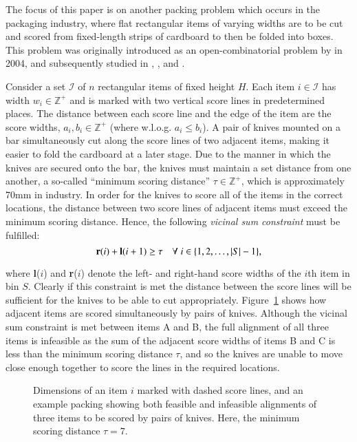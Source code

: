 \documentclass[authoryear]{elsarticle}
\begin{document}
The focus of this paper is on another packing problem which occurs in the packaging industry, where flat rectangular items of varying widths are to be cut and scored from fixed-length strips of cardboard to then be folded into boxes. This problem was originally introduced as an open-combinatorial problem by \citeauthor{goulimis2004} in 2004, and subsequently studied in \citet{lewis2011}, \citet{becker2015}, and \citet{hawa2018}.

Consider a set $\mathcal{I}$ of $n$ rectangular items of fixed height $H$. Each item $i \in \mathcal{I}$ has width $w_i \in \mathbb{Z}^+$ and is marked with two vertical score lines in predetermined places. The distance between each score line and the edge of the item are the score widths, $a_i, b_i \in \mathbb{Z}^+$ (where w.l.o.g. $a_i \leq b_i$). A pair of knives mounted on a bar simultaneously cut along the score lines of two adjacent items, making it easier to fold the cardboard at a later stage. Due to the manner in which the knives are secured onto the bar, the knives must maintain a set distance from one another, a so-called ``minimum scoring distance'' $\tau \in \mathbb{Z}^+$, which is approximately 70mm in industry. In order for the knives to score all of the items in the correct locations, the distance between two score lines of adjacent items must exceed the minimum scoring distance. Hence, the following \emph{vicinal sum constraint} must be fulfilled:
\begin{equation}
	\textbf{r}(i) + \textbf{l}(i+1) \geq \tau \quad \forall \hspace{1mm} i \in \{1,2,\dotsc,|S|- 1\},
	\label{eqn:vsc}
\end{equation}

\noindent where \textbf{l}($i$) and \textbf{r}($i$) denote the left- and right-hand score widths of the $i$th item in bin $S$. Clearly if this constraint is met the distance between the score lines will be sufficient for the knives to be able to cut appropriately. Figure~\ref{fig:itemsknife} shows how adjacent items are scored simultaneously by pairs of knives. Although the vicinal sum constraint is met between items A and B, the full alignment of all three items is infeasible as the sum of the adjacent score widths of items B and C is less than the minimum scoring distance $\tau$, and so the knives are unable to move close enough together to score the lines in the required locations.
\begin{figure}[H]	
	\centering
	
	\caption{Dimensions of an item $i$ marked with dashed score lines, and an example packing showing both feasible and infeasible alignments of three items to be scored by pairs of knives. Here, the minimum scoring distance $\tau = 7$.}	
	\label{fig:itemsknife}
\end{figure}
\end{document}
